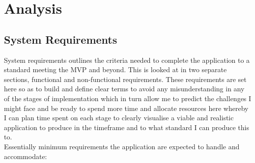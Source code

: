\documentclass[oneside]{report}
\begin{document}
\chapter{Analysis}
	\section{System Requirements}
	System requirements outlines the criteria needed to complete the application to a standard meeting the MVP and beyond. This is looked at in two separate sections, functional and non-functional requirements. These requirements are set here so as to build and define clear terms to avoid any misunderstanding in any of the stages of implementation which in turn allow me to predict the challenges I might face and be ready to spend more time and allocate resources here whereby I can plan time spent on each stage to clearly visualise a viable and realistic application to produce in the timeframe and to what standard I can produce this to.\\

Essentially minimum requirements the application are expected to handle and accommodate:
		\newpage
\end{document}
